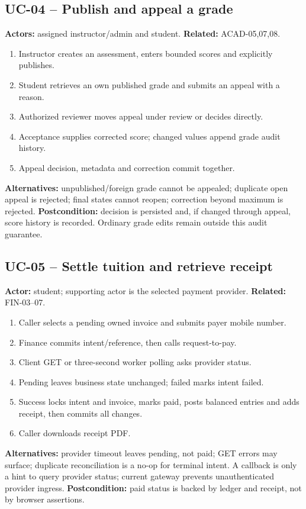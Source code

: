 \documentclass[10pt,a4paper]{article}
\begin{document}
\subsection{UC-04 -- Publish and appeal a grade}
\textbf{Actors:} assigned instructor/admin and student. \textbf{Related:} ACAD-05,07,08.
\begin{enumerate}
\item Instructor creates an assessment, enters bounded scores and explicitly publishes.
\item Student retrieves an own published grade and submits an appeal with a reason.
\item Authorized reviewer moves appeal under review or decides directly.
\item Acceptance supplies corrected score; changed values append grade audit history.
\item Appeal decision, metadata and correction commit together.
\end{enumerate}
\textbf{Alternatives:} unpublished/foreign grade cannot be appealed; duplicate open appeal
is rejected; final states cannot reopen; correction beyond maximum is rejected.
\textbf{Postcondition:} decision is persisted and, if changed through appeal, score history
is recorded. Ordinary grade edits remain outside this audit guarantee.

\subsection{UC-05 -- Settle tuition and retrieve receipt}
\textbf{Actor:} student; supporting actor is the selected payment provider.
\textbf{Related:} FIN-03--07.
\begin{enumerate}
\item Caller selects a pending owned invoice and submits payer mobile number.
\item Finance commits intent/reference, then calls request-to-pay.
\item Client GET or three-second worker polling asks provider status.
\item Pending leaves business state unchanged; failed marks intent failed.
\item Success locks intent and invoice, marks paid, posts balanced entries and adds receipt,
then commits all changes.
\item Caller downloads receipt PDF.
\end{enumerate}
\textbf{Alternatives:} provider timeout leaves pending, not paid; GET errors may surface;
duplicate reconciliation is a no-op for terminal intent. A callback is only a hint to
query provider status; current gateway prevents unauthenticated provider ingress.
\textbf{Postcondition:} paid status is backed by ledger and receipt, not by browser assertions.
\end{document}
